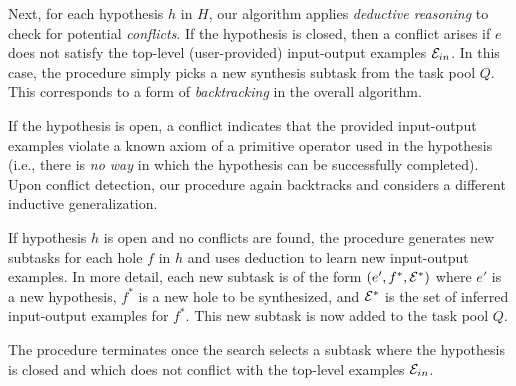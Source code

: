 Next, for each hypothesis $h$ in $H$, our algorithm applies \emph{deductive
  reasoning} to check for potential {\em conflicts}. If the hypothesis
is closed, then a conflict arises if $e$ does not satisfy the
top-level (user-provided) input-output examples $\mathcal{E}_{in}$. 
In this case, the procedure
simply picks a new synthesis subtask from the task pool $Q$.
This corresponds to a form of \emph{backtracking} in the overall algorithm.

If the hypothesis is open, a conflict indicates that the provided
input-output examples violate a known axiom of a primitive operator
used in the hypothesis (i.e., there is {\em no way} in which the
hypothesis can be successfully completed). Upon conflict detection,
our procedure again backtracks and considers a different inductive
generalization.

If  hypothesis $h$ is open and no conflicts are found, the procedure generates new subtasks for
each hole $f$ in $h$ and uses deduction to learn new
input-output examples. In more detail, each new subtask is of the
form $(e', f^*, \mathcal{E}^*)$ where $e'$ is a new hypothesis, $f^*$ is a
new hole to be synthesized, and $\mathcal{E}^*$ is the set of inferred
input-output examples for $f^*$. This new subtask is now added to the task pool $Q$.

The procedure terminates once the search selects a subtask where the
hypothesis is closed and which does not conflict with the top-level
examples $\mathcal{E}_{in}$. 


 


    

